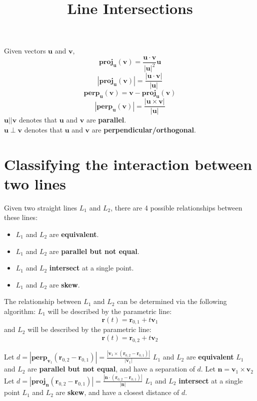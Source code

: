 \documentclass{article}
\title{Line Intersections}
\date{}
\newcommand{\abs}[1]{\left|#1\right|}
\begin{document}
\maketitle

Given vectors \(\mathbf{u}\) and \(\mathbf{v}\),
{%
\[\textbf{proj}_{\mathbf{u}}(\mathbf{v}) = \frac{\mathbf{u} \cdot \mathbf{v}}{\abs{\mathbf{u}}^2}\mathbf{u}\]
\[\abs{\textbf{proj}_{\mathbf{u}}(\mathbf{v})} = \frac{\abs{\mathbf{u} \cdot \mathbf{v}}}{\abs{\mathbf{u}}}\]
\[\textbf{perp}_{\mathbf{u}}(\mathbf{v}) = \mathbf{v} - \textbf{proj}_{\mathbf{u}}(\mathbf{v})\]
\[\abs{\textbf{perp}_{\mathbf{u}}(\mathbf{v})} = \frac{\abs{\mathbf{u} \times \mathbf{v}}}{\abs{\mathbf{u}}}\]
}
\(\mathbf{u}||\mathbf{v}\) denotes that \(\mathbf{u}\) and \(\mathbf{v}\) are \textbf{parallel}. \\
\(\mathbf{u}\perp\mathbf{v}\) denotes that \(\mathbf{u}\) and \(\mathbf{v}\) are \textbf{perpendicular/orthogonal}.


\section*{Classifying the interaction between two lines}

Given two straight lines \(L_1\) and \(L_2\), there are 4 possible relationships between these lines:
\begin{itemize}
\item \(L_1\) and \(L_2\) are \textbf{equivalent}. 
\item \(L_1\) and \(L_2\) are \textbf{parallel but not equal}. 
\item \(L_1\) and \(L_2\) \textbf{intersect} at a single point. 
\item \(L_1\) and \(L_2\) are \textbf{skew}.
\end{itemize}

The relationship between \(L_1\) and \(L_2\) can be determined via the following algorithm:
\(L_1\) will be described by the parametric line: 
\[\mathbf{r}(t) = \mathbf{r}_{0,1} + t\mathbf{v}_1\] 
and \(L_2\) will be described by the parametric line: 
\[\mathbf{r}(t) = \mathbf{r}_{0,2} + t\mathbf{v}_2\]

\pagebreak

\begin{framed}
\begin{algorithmic}
	\STATE Let \(d = \abs{\textbf{perp}_{\mathbf{v}_1}(\mathbf{r}_{0,2}-\mathbf{r}_{0,1})} = \frac{\abs{\mathbf{v}_1 \times (\mathbf{r}_{0,2}-\mathbf{r}_{0,1})}}{\abs{\mathbf{v}_1}}\)
		\STATE \(L_1\) and \(L_2\) are \textbf{equivalent}
	\ELSE
		\STATE \(L_1\) and \(L_2\) are \textbf{parallel but not equal}, and have a separation of \(d\). 
	\ENDIF
\ELSE
	\STATE Let \(\mathbf{n} = \mathbf{v}_1 \times \mathbf{v}_2\)
	\STATE Let \(d = \abs{\textbf{proj}_{\mathbf{n}}(\mathbf{r}_{0,2}-\mathbf{r}_{0,1})} = \frac{\abs{\mathbf{n} \cdot (\mathbf{r}_{0,2}-\mathbf{r}_{0,1})}}{\abs{\mathbf{n}}}\)
		\STATE \(L_1\) and \(L_2\) \textbf{intersect} at a single point
	\ELSE
		\STATE \(L_1\) and \(L_2\) are \textbf{skew}, and have a closest distance of \(d\). 
	\ENDIF
\ENDIF
\end{algorithmic}
\end{framed}
\end{document}
